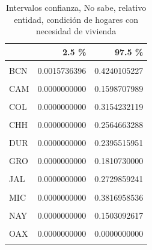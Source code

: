 \documentclass[
]{article}
\begin{document}
\begin{table}[H]

\caption{\label{tab:unnamed-chunk-21}Intervalos confianza, No sabe, relativo entidad,
    condición de hogares con necesidad de vivienda}
\centering
\begin{tabular}[t]{lrr}
\toprule
  & 2.5 \% & 97.5 \%\\
\midrule
\cellcolor{gray!6}{AGU} & \cellcolor{gray!6}{0.0351050750} & \cellcolor{gray!6}{0.5033970745}\\
BCN & 0.0015736396 & 0.4240105227\\
\cellcolor{gray!6}{BCS} & \cellcolor{gray!6}{0.0000000000} & \cellcolor{gray!6}{0.0000000000}\\
CAM & 0.0000000000 & 0.1598707989\\
\cellcolor{gray!6}{COA} & \cellcolor{gray!6}{0.0010998113} & \cellcolor{gray!6}{0.4021538017}\\
\addlinespace
COL & 0.0000000000 & 0.3154232119\\
\cellcolor{gray!6}{CHP} & \cellcolor{gray!6}{0.0000000000} & \cellcolor{gray!6}{0.3228577350}\\
CHH & 0.0000000000 & 0.2564663288\\
\cellcolor{gray!6}{CMX} & \cellcolor{gray!6}{0.0000000000} & \cellcolor{gray!6}{0.2857054535}\\
DUR & 0.0000000000 & 0.2395515951\\
\addlinespace
\cellcolor{gray!6}{GUA} & \cellcolor{gray!6}{0.0294923973} & \cellcolor{gray!6}{0.5076078504}\\
GRO & 0.0000000000 & 0.1810730000\\
\cellcolor{gray!6}{HID} & \cellcolor{gray!6}{0.0000000000} & \cellcolor{gray!6}{0.2169926908}\\
JAL & 0.0000000000 & 0.2729859241\\
\cellcolor{gray!6}{MEX} & \cellcolor{gray!6}{0.0009105259} & \cellcolor{gray!6}{0.3218431276}\\
\addlinespace
MIC & 0.0000000000 & 0.3816958536\\
\cellcolor{gray!6}{MOR} & \cellcolor{gray!6}{0.0000000000} & \cellcolor{gray!6}{0.1813901728}\\
NAY & 0.0000000000 & 0.1503092617\\
\cellcolor{gray!6}{NLE} & \cellcolor{gray!6}{0.0000000000} & \cellcolor{gray!6}{0.2679640141}\\
OAX & 0.0000000000 & 0.0000000000\\
\addlinespace
\cellcolor{gray!6}{PUE} & \cellcolor{gray!6}{0.0000000000} & \cellcolor{gray!6}{0.1349858683}\\

\end{tabular}
\end{table}
\end{document}
